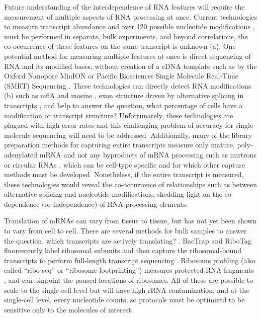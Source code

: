 Future understanding of the interdependence of RNA features will require the measurement of multiple aspects of RNA processing at once. Current technologies to measure transcript abundance and over 120 possible nucleotide modifications \cite{Ferre-DAmare2003-to,Gilbert2016-pg,Li2014-dq,Saletore2012-fp,Sun2016-rk}, must be performed in separate, bulk experiments, and beyond correlations, the co-occurrence of these features on the same transcript is unknown (a). One potential method for measuring multiple features at once is direct sequencing of RNA and its modified bases, without creation of a cDNA template such as by the Oxford Nanopore MinION \cite{Goodwin2015-ca,Jain2016-yb,Loman2014-ss,Mikheyev2014-gd} or Pacific Biosciences Single Molecule Real-Time (SMRT) Sequencing \cite{Flusberg2010-yf}. These technologies can directly detect RNA modifications (b) such as m6A and inosine \cite{Carr2016-bc,Garalde2016-iw,Saletore2012-fp}, exon structure driven by alternative splicing in transcripts \cite{Karlsson2017-wy}, and help to answer the question, what percentage of cells have a modification or transcript structure? Unfortunately, these technologies are plagued with high error rates and this challenging problem of accuracy for single molecule sequencing will need to be addressed. Additionally, many of the library preparation methods for capturing entire transcripts measure only mature, poly-adenylated mRNA and not any byproducts of mRNA processing such as mirtrons or circular RNAs \cite{Salzman2013-ol}, which can be cell-type specific and for which other capture methods must be developed. Nonetheless, if the entire transcript is measured, these technologies would reveal the co-occurrence of relationships such as between alternative splicing and nucleotide modifications, shedding light on the co-dependence (or independence) of RNA processing elements.

Translation of mRNAs can vary from tissue to tissue, but has not yet been shown to vary from cell to cell. There are several methods for bulk samples to answer the question, which transcripts are actively translating? \cite{King2016-yp,Lesiak2016-ji}. BacTrap and RiboTag fluorescently label ribosomal subunits and then capture the ribosomal-bound transcripts to perform full-length transcript sequencing \cite{Lesiak2016-ji}. Ribosome profiling (also called ``ribo-seq'' or ``ribosome footprinting'') measures protected RNA fragments \cite{Brar2012-pj,Ingolia2009-zu,Ingolia2011-gf}, and can pinpoint the paused locations of ribosomes. All of these are possible to scale to the single-cell level but will have high rRNA contamination, and at the single-cell level, every nucleotide counts, so protocols must be optimized to be sensitive only to the molecules of interest.

